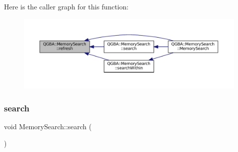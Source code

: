 Here is the caller graph for this function\+:
\nopagebreak
\begin{figure}[H]
\begin{center}
\leavevmode
\includegraphics[width=350pt]{class_q_g_b_a_1_1_memory_search_a164cb44bd1de9560f3d8d7b892167e5c_icgraph}
\end{center}
\end{figure}
\mbox{\label{class_q_g_b_a_1_1_memory_search_acf927801198317c863b8918ab85eb94f}} 
\subsubsection{\texorpdfstring{search}{search}}
{\footnotesize\ttfamily void Memory\+Search\+::search (\begin{DoxyParamCaption}{ }\end{DoxyParamCaption})\hspace{0.3cm}{\ttfamily [slot]}}

